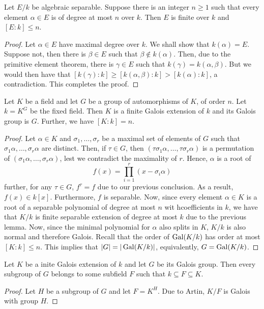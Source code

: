 \begin{lemma}
    Let $E/k$ be algebraic separable. Suppose there is an integer $n\ge 1$ such that every element $\alpha\in E$ is of degree at most $n$ over $k$. Then $E$ is finite over $k$ and $[E:k]\le n$.
\end{lemma}
\begin{proof}
    Let $\alpha\in E$ have maximal degree over $k$. We shall show that $k(\alpha) = E$. Suppose not, then there is $\beta\in E$ such that $\beta\notin k(\alpha)$. Then, due to the primitive element theorem, there is $\gamma\in E$ such that $k(\gamma) = k(\alpha,\beta)$. But we would then have that $[k(\gamma):k]\ge [k(\alpha,\beta):k] > [k(\alpha):k]$, a contradiction. This completes the proof.
\end{proof}

\begin{theorem}[Artin]
    Let $K$ be a field and let $G$ be a group of automorphisms of $K$, of order $n$. Let $k = K^G$ be the fixed field. Then $K$ is a finite Galois extension of $k$ and its Galois group is $G$. Further, we have $[K:k] = n$.
\end{theorem}
\begin{proof}
    Let $\alpha\in K$ and $\sigma_1,\ldots,\sigma_r$ be a maximal set of elements of $G$ such that $\sigma_1\alpha,\ldots,\sigma_r\alpha$ are distinct. Then, if $\tau\in G$, then $(\tau\sigma_1\alpha,\ldots,\tau\sigma_r\alpha)$ is a permutation of $(\sigma_1\alpha,\ldots,\sigma_r\alpha)$, lest we contradict the maximality of $r$. Hence, $\alpha$ is a root of 
    \begin{equation*}
        f(x) = \prod_{i = 1}^r(x - \sigma_i\alpha)
    \end{equation*}
    further, for any $\tau\in G$, $f^\tau = f$ due to our previous conclusion. As a result, $f(x)\in k[x]$. Furthermore, $f$ is separable. Now, since every element $\alpha\in K$ is a root of a separable polynomial of degree at most $n$ wit hcoefficients in $k$, we have that $K/k$ is finite separable extension of degree at most $k$ due to the previous lemma. Now, since the minimal polynomial for $\alpha$ also splits in $K$, $K/k$ is also normal and therefore Galois. Recall that the order of $\operatorname{Gal}(K/k)$ has order at most $[K:k]\le n$. This implies that $|G| = |\operatorname{Gal}(K/k)|$, equivalently, $G = \operatorname{Gal}(K/k)$.
\end{proof}

\begin{corollary}
    Let $K$ be a inite Galois extension of $k$ and let $G$ be its Galois group. Then every subgroup of $G$ belongs to some subfield $F$ such that $k\subseteq F\subseteq K$.
\end{corollary}
\begin{proof}
    Let $H$ be a subgroup of $G$ and let $F = K^H$. Due to Artin, $K/F$ is Galois with group $H$.
\end{proof}

